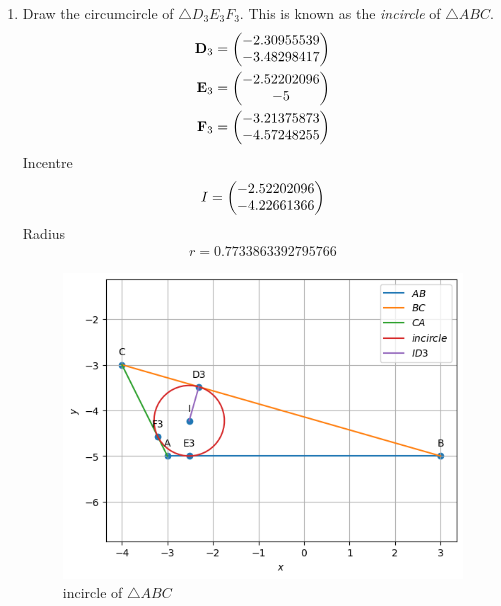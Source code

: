 \documentclass[11pt]{book}
\begin{document}
\begin{enumerate}[label=\thesection.\arabic*.,ref=\thesection.\theenumi]
\item Draw the circumcircle of $\triangle D_3E_3F_3$.  This is known as the {\em incircle} of $\triangle ABC$. \\
\solution 
\begin{align}
    \mathbf{D}_3 &= \begin{pmatrix}-2.30955539  \\ -3.48298417\end{pmatrix} \\
    \mathbf{E}_3 &= \begin{pmatrix}-2.52202096  \\ -5\end{pmatrix} \\
    \mathbf{F}_3 &= \begin{pmatrix}-3.21375873 \\ -4.57248255\end{pmatrix} 
\end{align}
Incentre 
\begin{align}
    I= \begin{pmatrix}-2.52202096 \\ -4.22661366\end{pmatrix}
\end{align}
Radius
\begin{align}
 r=0.7733863392795766 
\end{align}
\begin{figure}[H]
    \centering
    \includegraphics{figs/Ang_bisect3.png}
    \caption{incircle of $\triangle ABC$ }
    \label{fig:Ang_bisect3}
\end{figure}



\end{enumerate}
\end{document}
